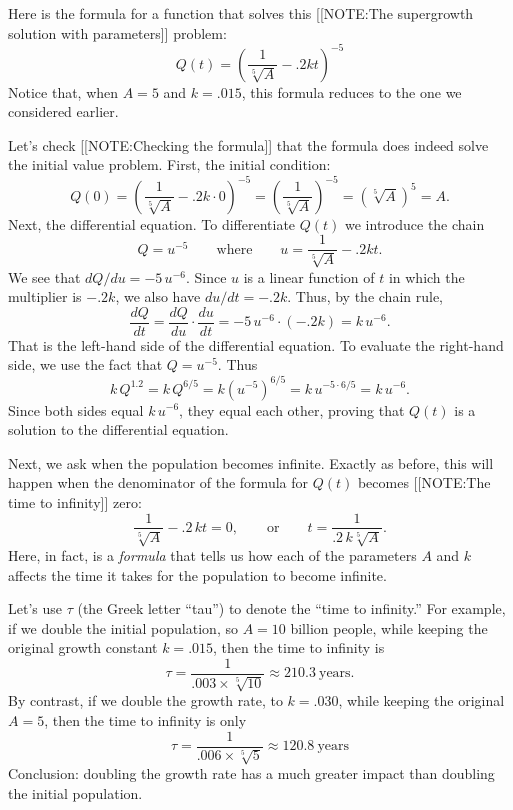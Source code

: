 Here is the formula for a function that solves this 
	[[NOTE:The supergrowth solution with parameters]]
problem:\label{supergrowth soln}
	\[
Q(t) =\left( \frac{1}{\sqrt[5]{A}} -.2kt \right)^{-5}
\]
Notice that, when $A = 5$ and $k = .015$, this formula reduces to the one we considered earlier.

	Let's check 
	[[NOTE:Checking the formula]]
that the formula does indeed solve the initial value problem.  First, the initial condition:
	\[
Q(0)=\left( \frac{1}{\sqrt[5]{A}} -.2k \cdot 0
		\right)^{-5} =
		\left(\frac{1}{\sqrt[5]{A}}\right)^{-5} =
		(\sqrt[5]{A})^5 = A.
\]
Next, the differential equation.  To differentiate $Q(t)$ we introduce the chain
	\[
Q = u^{-5} \qquad \mbox{where} \qquad 
		u = \frac{1}{\sqrt[5]{A}} -.2kt.
\]
We see that $dQ/du = -5\,u^{-6}$.  Since $u$ is a linear function of $t$ in which the multiplier is $-.2k$, we also have $du/dt = -.2k$.  Thus, by the chain rule,
	\[
\dfrac{dQ}{dt} = \dfrac{dQ}{du} \cdot \dfrac{du}{dt} =
		-5\,u^{-6} \cdot (-.2k) = k\,u^{-6}.
\]
That is the left-hand side of the differential equation.  To evaluate the right-hand side, we use the fact that $Q = 
u^{-5}$.  Thus
	\[
k\,Q^{1.2} = k\,Q^{6/5} = k(u^{-5})^{6/5} = 
		k\,u^{-5 \cdot 6/5} = k\,u^{-6}.
\]
Since both sides equal $k\,u^{-6}$, they equal each other, proving that $Q(t)$ is a solution to the differential equation.



	Next, we ask when the population becomes infinite.  Exactly as before, this will happen when the denominator of the formula for $Q(t)$ becomes 
	[[NOTE:The time to infinity]]
zero:
	\[
\dfrac{1}{\sqrt[5]{A}} - .2\,kt = 0, \qquad \mbox{or}
		\qquad t = \dfrac{1}{.2\,k\sqrt[5]{A}}.
\]
Here, in fact, is a {\em formula\/} that tells us how each of the parameters $A$ and $k$ affects the time it takes for the population to become infinite.

	Let's use $\tau$ (the Greek letter ``tau'') to denote the ``time to infinity.''  For example, if we double the initial population, so $A = 10$ billion people, while keeping the original growth constant $k = .015$, then the time to infinity is
	\[
\tau = \dfrac{1}{.003 \times \sqrt[5]{10}} \approx
		 210.3 \ \mbox{years}.
\]
By contrast, if we double the growth rate, to $k = .030$, while keeping the original $A = 5$, then the time to infinity is only
	\[
\tau = \dfrac{1}{.006 \times \sqrt[5]{5}} \approx
		120.8 \ \mbox{years}
\]
Conclusion: doubling the growth rate has a much greater impact than doubling the initial population.  

